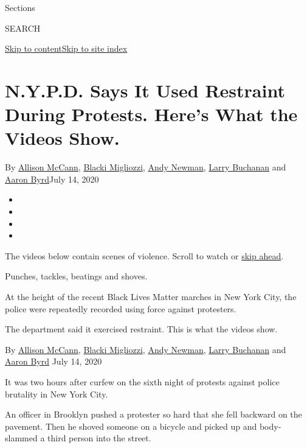 Sections

SEARCH

\protect\hyperlink{site-content}{Skip to
content}\protect\hyperlink{site-index}{Skip to site index}

\hypertarget{nypd-says-it-used-restraint-during-protests-heres-what-the-videos-show}{%
\section{N.Y.P.D. Says It Used Restraint During Protests. Here's What
the Videos
Show.}\label{nypd-says-it-used-restraint-during-protests-heres-what-the-videos-show}}

By \href{https://www.nytimes3xbfgragh.onion/by/allison-mccann}{Allison
McCann},
\href{https://www.nytimes3xbfgragh.onion/by/blacki-migliozzi}{Blacki
Migliozzi},
\href{https://www.nytimes3xbfgragh.onion/by/andy-newman}{Andy Newman},
\href{https://www.nytimes3xbfgragh.onion/by/larry-buchanan}{Larry
Buchanan} and
\href{https://www.nytimes3xbfgragh.onion/by/aaron-byrd}{Aaron Byrd}July
14, 2020

\begin{itemize}
\item
\item
\item
\item
\end{itemize}

The videos below contain scenes of violence. Scroll to watch or
\protect\hyperlink{g-top}{skip ahead}.

Punches, tackles, beatings and shoves.

At the height of the recent Black Lives Matter marches in New York City,
the police were repeatedly recorded using force against protesters.

The department said it exercised restraint. This is what the videos
show.

 By \href{https://www.nytimes3xbfgragh.onion/by/allison-mccann}{Allison
McCann},
\href{https://www.nytimes3xbfgragh.onion/by/blacki-migliozzi}{Blacki
Migliozzi},
\href{https://www.nytimes3xbfgragh.onion/by/andy-newman}{Andy Newman},
\href{https://www.nytimes3xbfgragh.onion/by/larry-buchanan}{Larry
Buchanan} and
\href{https://www.nytimes3xbfgragh.onion/by/aaron-byrd}{Aaron Byrd} July
14, 2020

It was two hours after curfew on the sixth night of protests against
police brutality in New York City.

An officer in Brooklyn pushed a protester so hard that she fell backward
on the pavement. Then he shoved someone on a bicycle and picked up and
body-slammed a third person into the street.

